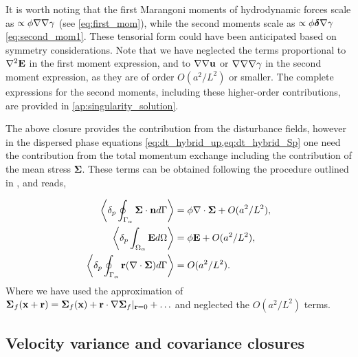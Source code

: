 It is worth noting that the first Marangoni moments of hydrodynamic forces scale as $\propto \phi \mathbf{\nabla}\mathbf{\nabla} \gamma$ (see \ref{eq:first_mom}), while the second moments scale as $\propto \phi \bm\delta \mathbf{\nabla} \gamma$ \eqref{eq:second_mom1}.
These tensorial form could have been anticipated based on symmetry considerations. 
Note that we have neglected the terms proportional to $\mathbf{\nabla}^2 \textbf{E}$ in the first moment expression, and to $\mathbf{\nabla}\mathbf{\nabla} \textbf{u}$ or $\mathbf{\nabla}\mathbf{\nabla}\mathbf{\nabla} \gamma$ in the second moment expression, as they are of order $O(a^2/L^2)$ or smaller.
The complete expressions for the second moments, including these higher-order contributions, are provided in \ref{ap:singularity_solution}.

The above closure provides the contribution from the disturbance fields, however in the dispersed phase equations \eqref{eq:dt_hybrid_up,eq:dt_hybrid_Sp} one need the contribution from the total momentum exchange including the contribution of the mean stress $\bm\Sigma$. 
These terms can be obtained following the procedure outlined in \citep{zhang1997momentum,morel2015mathematical}, and reads, 

\begin{align}
    \pSavg{\bm\Sigma\cdot \textbf{n}}
    &= \phi\div\bm\Sigma + O(a^2/L^2),\\
    \pOavg{\textbf{E}}
    &= \phi \textbf{E}+ O(a^2/L^2),\\
    \pSavg{\textbf{r}(\div \bm\Sigma)}
    &= O(a^2/L^2). 
    \label{eq:mean_contributions}
\end{align}
Where we have used the approximation of $\bm\Sigma_f(\textbf{x}+\textbf{r}) = \bm\Sigma_f(\textbf{x}) + \textbf{r}\cdot\mathbf{\nabla} \bm\Sigma_f|_{\textbf{r}=0} + \ldots$ and neglected the $O(a^2/L^2)$ terms. 


\subsection{Velocity variance and covariance closures}


